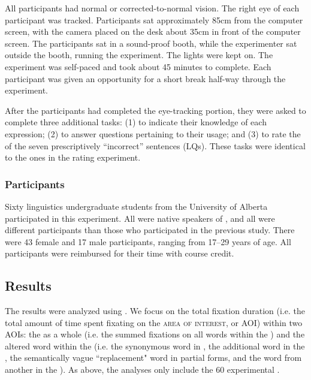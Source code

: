\documentclass[output=paper
,modfonts
,nonflat]{langsci/langscibook}
\begin{document}
All participants had normal or corrected-to-normal vision. The right eye of each participant was tracked. Participants sat approximately 85cm from the computer screen, with the camera placed on the desk about 35cm in front of the computer screen. The participants sat in a sound-proof booth, while the experimenter sat outside the booth, running the experiment. The lights were kept on. The experiment was self-paced and took about 45 minutes to complete. Each participant was given an opportunity for a short break half-way through the experiment.

After the participants had completed the eye-tracking portion, they were asked to complete three additional tasks: (1) to indicate their knowledge of each expression; (2) to answer questions pertaining to their   usage; and (3) to rate the  of the seven prescriptively ``incorrect'' sentences (LQs). These tasks were identical to the ones in the  rating experiment.



\subsubsection{Participants}

Sixty linguistics undergraduate students from the University of Alberta participated in this experiment. All were native speakers of , and all were different participants than those who participated in the previous study. There were 43 female and 17 male participants, ranging from 17--29 years of age. All participants were reimbursed for their time with course credit.



\subsection{Results}

The results were analyzed using . We focus on the total fixation duration (i.e. the total amount of time spent fixating on the \textsc{area of interest}, or AOI) within two AOIs: the  as a whole (i.e. the summed fixations on all words within the ) and the altered word within the  (i.e. the synonymous word in , the additional word in the , the semantically vague ``replacement" word in partial forms,  and the word from another  in the  ).  As above, the analyses only include the 60 experimental . %
\end{document}
